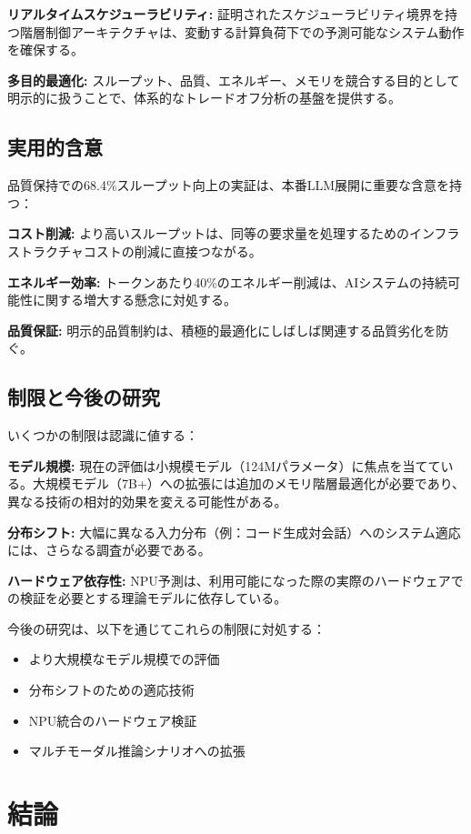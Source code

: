 \documentclass[10pt,twocolumn,a4paper]{jarticle}
\begin{document}
\textbf{リアルタイムスケジューラビリティ:} 証明されたスケジューラビリティ境界を持つ階層制御アーキテクチャは、変動する計算負荷下での予測可能なシステム動作を確保する。

\textbf{多目的最適化:} スループット、品質、エネルギー、メモリを競合する目的として明示的に扱うことで、体系的なトレードオフ分析の基盤を提供する。

\subsection{実用的含意}

品質保持での68.4\%スループット向上の実証は、本番LLM展開に重要な含意を持つ：

\textbf{コスト削減:} より高いスループットは、同等の要求量を処理するためのインフラストラクチャコストの削減に直接つながる。

\textbf{エネルギー効率:} トークンあたり40\%のエネルギー削減は、AIシステムの持続可能性に関する増大する懸念に対処する。

\textbf{品質保証:} 明示的品質制約は、積極的最適化にしばしば関連する品質劣化を防ぐ。

\subsection{制限と今後の研究}

いくつかの制限は認識に値する：

\textbf{モデル規模:} 現在の評価は小規模モデル（124Mパラメータ）に焦点を当てている。大規模モデル（7B+）への拡張には追加のメモリ階層最適化が必要であり、異なる技術の相対的効果を変える可能性がある。

\textbf{分布シフト:} 大幅に異なる入力分布（例：コード生成対会話）へのシステム適応には、さらなる調査が必要である。

\textbf{ハードウェア依存性:} NPU予測は、利用可能になった際の実際のハードウェアでの検証を必要とする理論モデルに依存している。

今後の研究は、以下を通じてこれらの制限に対処する：
\begin{itemize}
\item より大規模なモデル規模での評価
\item 分布シフトのための適応技術
\item NPU統合のハードウェア検証
\item マルチモーダル推論シナリオへの拡張
\end{itemize}

\section{結論}
\end{document}
